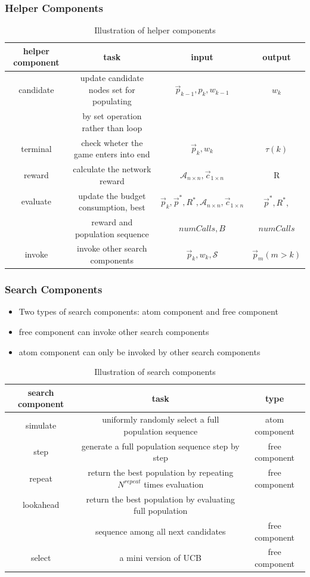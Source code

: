 \documentclass[compress]{beamer}
\begin{document}
\begin{frame}
\frametitle{Helper Components}
\begin{table}[htbp]
  \centering
  \tiny
  \caption{Illustration of helper components}
    \begin{tabular}{cccc}
    \toprule
    helper component &  task  & input & output \\
    \midrule
    candidate & update candidate nodes set for populating & $\vec p_{k-1}, p_{k}, w_{k-1}$ & $w_{k}$\\
     & by set operation rather than loop& & \\
    terminal & check wheter the game enters into end & $\vec p_{k}, w_{k}$ & $\tau(k)$ \\
    reward & calculate the network reward & $\mathcal{A}_{n \times n}, \vec c_{1 \times n}$ & R\\
    evaluate & update the budget consumption, best & $\vec p_{k}, \vec p^{*}, R^{*}, \mathcal{A}_{n \times n}, \vec c_{1 \times n}$ & $\vec p^{*}, R^{*}, $\\
      & reward and population sequence & $numCalls, B$ & $ numCalls$ \\
    invoke & invoke other search components & $\vec p_{k}, w_{k}, \mathcal{S}$ & $\vec p_{m} (m > k)$ \\
    \bottomrule
    \end{tabular}%
  \label{tab:helper_components}%
\end{table}%
\end{frame}

\begin{frame}
\frametitle{Search Components}
\begin{itemize}
  \item Two types of search components: atom component and free component
  \item free component can invoke other search components
  \item atom component can only be invoked by other search components
\end{itemize}
\begin{table}[htbp]
  \tiny
  \centering
  \caption{Illustration of search components}
    \begin{tabular}{ccc}
    \toprule
    search component &  task & type\\
    \midrule
    simulate & uniformly randomly select a full population sequence & atom component\\
    step & generate a full population sequence step by step & free component\\
    repeat & return the best population by repeating $N^{repeat}$ times evaluation & free component\\
    lookahead & return the best population by evaluating full population &  \\
    & sequence among all next candidates & free component\\
    select & a mini version of UCB & free component\\
    \bottomrule
    \end{tabular}%
  \label{tab:search_components}%
\end{table}%
\end{frame}
\end{document}
